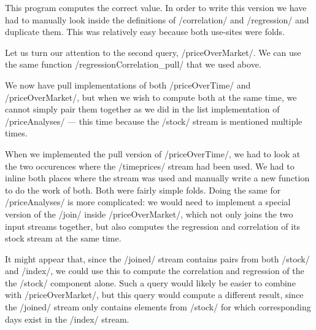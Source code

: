 This program computes the correct value.
In order to write this version we have had to manually look inside the definitions of \Hs/correlation/ and \Hs/regression/ and duplicate them.
This was relatively easy because both use-sites were folds.


Let us turn our attention to the second query, \Hs/priceOverMarket/.
We can use the same function \Hs/regressionCorrelation_pull/ that we used above.


We now have pull implementations of both \Hs/priceOverTime/ and \Hs/priceOverMarket/, but when we wish to compute both at the same time, we cannot simply pair them together as we did in the list implementation of \Hs/priceAnalyses/ --- this time because the \Hs/stock/ stream is mentioned multiple times.

When we implemented the pull version of \Hs/priceOverTime/, we had to look at the two occurences where the \Hs/timeprices/ stream had been used.
We had to inline both places where the stream was used and manually write a new function to do the work of both.
Both were fairly simple folds.
Doing the same for \Hs/priceAnalyses/ is more complicated: we would need to implement a special version of the \Hs/join/ inside \Hs/priceOverMarket/, which not only joins the two input streams together, but also computes the regression and correlation of its stock stream at the same time.

It might appear that, since the \Hs/joined/ stream contains pairs from both \Hs/stock/ and \Hs/index/, we could use this to compute the correlation and regression of the the \Hs/stock/ component alone.
Such a query would likely be easier to combine with \Hs/priceOverMarket/, but this query would compute a different result, since the \Hs/joined/ stream only contains elements from \Hs/stock/ for which corresponding days exist in the \Hs/index/ stream.


